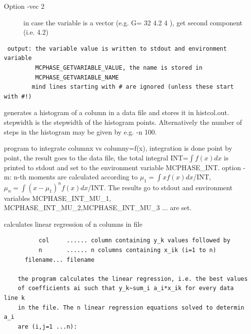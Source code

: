 \begin{description}
\begin{description}
\item[Option   -vec 2  ]   in case the variable is a vector (e.g. G= 32 4.2 4 ), get second component 
                   (i.e. 4.2)
\end{description}
\begin{verbatim}
 output: the variable value is written to stdout and environment variable 
         MCPHASE_GETVARIABLE_VALUE, the name is stored in 
         MCPHASE_GETVARIABLE_NAME
        mind lines starting with # are ignored (unless these start with #!)
\end{verbatim}
\item[\prg histcol\index{histcol}\label{histcol} col {[stepwidth|-n steps]} *.*:] generates a histogram of
a column in a data file and stores it in histcol.out. stepwidth is the 
stepwidth of the histogram points. Alternatively the number of
steps in the histogram may be given by e.g. {\prg -n 100}.
\item[\prg int\index{int}\label{int} {[-m] }colx coly *.*:]
 program  to integrate columnx vs columny=f(x), integration is done 
point by point, the result goes to the data file, the total integral 
INT=$\int f(x)dx$ is printed to stdout and set to the 
 environment variable MCPHASE\_INT.
 option -m: n-th moments are calculated according to $\mu_1=\int x f(x)dx$/INT, $\mu_n=\int (x-\mu_1)^n f(x)dx$/INT.
The results go to stdout and environment variables MCPHASE\_INT\_MU\_1,
  MCPHASE\_INT\_MU\_2,MCPHASE\_INT\_MU\_3 ... are set.
\item [\prg linreg\index{linreg}\label{linreg} col n file:] calculates linear regression of n columns in file
\begin{verbatim}
          col     ...... column containing y_k values followed by
          n       ...... n columns containing x_ik (i=1 to n)
	  filename... filename

    the program calculates the linear regression, i.e. the best values
    of coefficients ai such that y_k~sum_i a_i*x_ik for every data line k
    in the file. The n linear regression equations solved to determin a_i
    are (i,j=1 ...n):


\end{verbatim}
\end{description}
